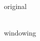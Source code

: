 \documentclass[12pt,a4paper,oneside,openright]{book}
\begin{document}
\begin{CJK}{UTF8}{}
\begin{figure}[htbp]
\begin{center}
\begin{minipage}[t]{.48\textwidth}
\begin{center}
         original
       \end{center}
     \end{minipage}
     \begin{minipage}[t]{.48\textwidth}
       \begin{center}
         \\
         windowing
       \end{center}
     \end{minipage}\\
     \begin{minipage}[t]{.48\textwidth}
       \begin{center}
         \\

\end{center}
\end{minipage}
\end{center}
\end{figure}
\end{CJK}
\end{document}
